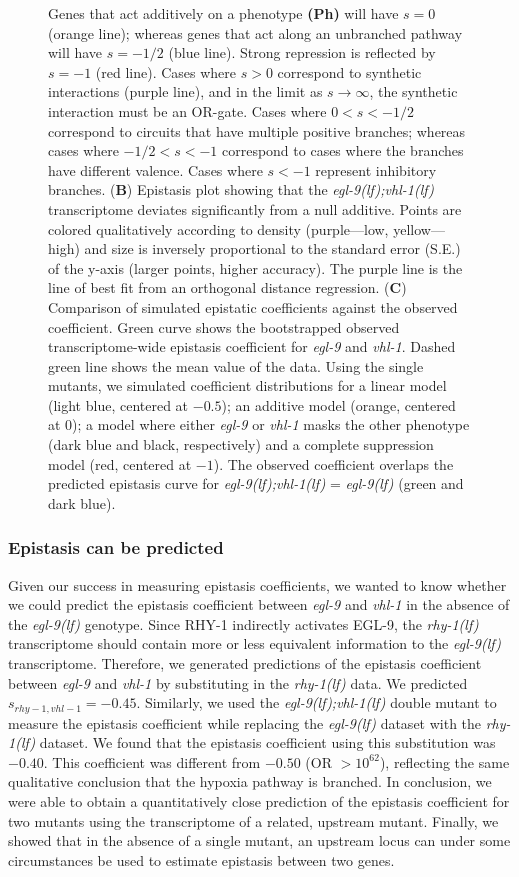 \documentclass[9pt,twocolumn,twoside]{pnas-new}
\newcommand{\gene}[1]{\emph{#1}}
\newcommand{\egl}{\emph{\mbox{egl-9}(lf)}}
\newcommand{\rhy}{\emph{\mbox{rhy-1}(lf)}}
\newcommand{\eglvhl}{\emph{\mbox{egl-9(lf);vhl-1(lf)}}}
\newcommand{\eglp}{EGL-9}
\newcommand{\rhyp}{RHY-1}
\begin{document}
\begin{figure}[tbhp]
{Genes that act additively on a phenotype \textbf{(Ph)} will have $s=0$ (orange
line); whereas
genes that act along an unbranched pathway will have $s=-1/2$ (blue line).
Strong
repression is reflected by $s=-1$ (red line). Cases where $s>0$ correspond to
synthetic interactions (purple line), and in the limit as $s\rightarrow\infty$,
the synthetic interaction
must be an OR-gate. Cases where $0 < s < -1/2$ correspond to circuits
that have multiple positive branches; whereas cases where
$-1/2<s< -1$ correspond to cases where the branches have different valence.
Cases where $s < -1$ represent inhibitory branches.
(\textbf{B}) Epistasis plot showing
that the \eglvhl{} transcriptome deviates significantly from a null additive.
Points are colored qualitatively according to density (purple---low,
yellow---high) and size is inversely proportional to the standard
error (S.E.) of the y-axis (larger points, higher accuracy). The purple line
is the line of best fit from an orthogonal distance regression.
(\textbf{C}) Comparison of simulated epistatic coefficients against the observed
coefficient. Green curve shows the bootstrapped observed transcriptome-wide epistasis
coefficient for \gene{egl-9} and \gene{vhl-1}. Dashed green line shows the mean
value of the data. Using the single mutants, we simulated coefficient
distributions for a linear model (light blue, centered at $-0.5$);
an additive model (orange, centered at 0); a model where either
\gene{egl-9} or \gene{vhl-1} masks the other phenotype (dark blue and black,
respectively) and a complete suppression model (red, centered at $-1$).
The observed coefficient overlaps the predicted epistasis curve for
\eglvhl{} = \egl{} (green and dark blue).
}
\label{fig:egl9epistasis}
\end{figure}

\subsubsection*{Epistasis can be predicted}
Given our success in measuring epistasis coefficients, we wanted to know whether
we could predict the epistasis coefficient between \gene{egl-9} and \gene{vhl-1}
in the absence of the \egl{} genotype. Since \rhyp{} indirectly activates
\eglp{}, the \rhy{} transcriptome should contain more or less
equivalent information to the \egl{} transcriptome. Therefore, we generated
predictions of the epistasis coefficient between \gene{egl-9} and \gene{vhl-1}
by substituting in the \rhy{} data. We predicted $s_{rhy-1,vhl-1} = -0.45$.
Similarly, we used the \eglvhl{} double mutant to
measure the epistasis coefficient while replacing the \egl{} dataset with the \rhy{}
dataset. We found that the epistasis coefficient using this substitution was $-0.40$.
This coefficient was different from $-0.50$ (OR $>10^{62}$), reflecting the same
qualitative conclusion that the hypoxia pathway is branched.
In conclusion, we were able to obtain a quantitatively close prediction of the
epistasis coefficient for two mutants using the transcriptome of a related,
upstream mutant. Finally, we showed that in the absence of a single mutant, an
upstream locus can under some circumstances be used to estimate epistasis
between two genes.
\end{document}
